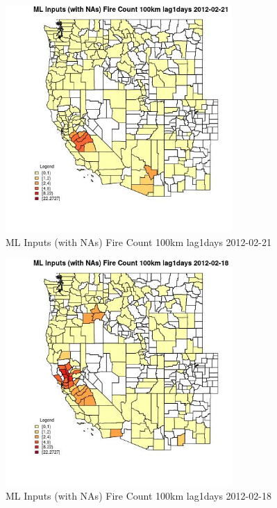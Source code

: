 \begin{figure} 
\centering  
\includegraphics[width=0.77\textwidth]{Code_Outputs/Report_ML_input_PM25_Step4_part_f_de_duplicated_aves_prioritize_24hr_obswNAs_CountyFire_Count_100km_lag1daysMean2012-02-21.jpg} 
\caption{\label{fig:Report_ML_input_PM25_Step4_part_f_de_duplicated_aves_prioritize_24hr_obswNAsCountyFire_Count_100km_lag1daysMean2012-02-21}ML Inputs (with NAs) Fire Count 100km lag1days 2012-02-21} 
\end{figure} 
 

\begin{figure} 
\centering  
\includegraphics[width=0.77\textwidth]{Code_Outputs/Report_ML_input_PM25_Step4_part_f_de_duplicated_aves_prioritize_24hr_obswNAs_CountyFire_Count_100km_lag1daysMean2012-02-18.jpg} 
\caption{\label{fig:Report_ML_input_PM25_Step4_part_f_de_duplicated_aves_prioritize_24hr_obswNAsCountyFire_Count_100km_lag1daysMean2012-02-18}ML Inputs (with NAs) Fire Count 100km lag1days 2012-02-18} 
\end{figure} 
 

